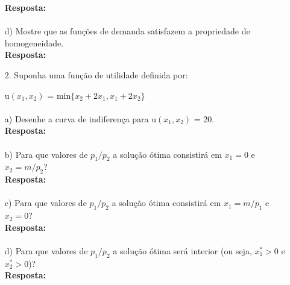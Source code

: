 \begin{enumerate}
\textbf{Resposta:}\\

\paragraph{} d) Mostre que as funções de demanda satisfazem a propriedade de homogeneidade.\\

\textbf{Resposta:}\\

\item[2.] Suponha uma função de utilidade definida por:
\begin{center}
u{$(x_1, x_2)$} = min{$\{x_2 + 2x_1, x_1 + 2x_2\}$}\\
\end{center}

\paragraph{} a) Desenhe a curva de indiferença para u{$(x_1, x_2)$} = 20.\\

\textbf{Resposta:}\\

\paragraph{} b)  Para que valores de {$p_1/p_2$} a solução ótima consistirá em {$x_1 = 0$} e {$x_2 = m/p_2$}?\\

\textbf{Resposta:}\\

\paragraph{} c) Para que valores de {$p_1/p_2$} a solução ótima consistirá em {$x_1 = m/p_1$} e {$x_2 = 0$}?\\

\textbf{Resposta:}\\

\paragraph{} d) Para que valores de {$p_1/p_2$} a solução ótima será interior (ou seja, {$x_{1}^{*} > 0$} e {$x_{2}^{*} > 0$})?\\

\textbf{Resposta:}\\


\end{enumerate}
